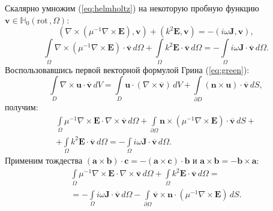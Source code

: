 \documentclass[a4paper,14pt]{article}
\begin{document}
Скалярно умножим (\ref{eq:helmholtz}) на некоторую пробную функцию $\mathbf{v} \in \mathbb{H}_{0}( \mathrm{rot}\,, \Omega )$:
\begin{equation*}
	(\nabla \times ( \mu^{-1} \nabla \times \mathbf{E} ), \mathbf{v}) + (k^{2} \mathbf{E} , \mathbf{v}) = - (i \omega \mathbf{J} , \mathbf{v}) ,
\end{equation*}
\begin{equation*}
	\int\limits_\Omega \nabla \times ( \mu^{-1} \nabla \times \mathbf{E} ) \cdot \overline{\mathbf{v}} \,d\Omega + \int\limits_\Omega k^{2} \mathbf{E} \cdot \overline{\mathbf{v}} \,d\Omega = - \int\limits_\Omega i \omega \mathbf{J} \cdot \overline{\mathbf{v}} \,d\Omega .
\end{equation*}
Воспользовавшись первой векторной формулой Грина (\ref{eq:green}):
\begin{equation}
	\int\limits_D \nabla \times \mathbf{u} \cdot \overline{\mathbf{v}} \,dV = \int\limits_D \mathbf{u} \cdot ( \nabla \times \overline{\mathbf{v}} ) \,dV + \int\limits_{\partial D} (\mathbf{n} \times \mathbf{u}) \cdot \overline{\mathbf{v}} \,dS , \label{eq:green}
\end{equation}
получим:
\begin{equation*}
	\begin{array}{c} { \displaystyle
		\int\limits_\Omega \mu^{-1} \nabla \times \mathbf{E} \cdot \nabla \times \overline{\mathbf{v}} \,d\Omega
		+ \int\limits_{\partial \Omega} \mathbf{n} \times (\mu^{-1} \nabla \times \mathbf{E}) \cdot \overline{\mathbf{v}} \,dS
		+
	} \\ { \displaystyle
		+ \int\limits_\Omega k^{2} \mathbf{E} \cdot \overline{\mathbf{v}} \,d\Omega
		=  - \int\limits_\Omega i \omega \mathbf{J} \cdot \overline{\mathbf{v}} \,d\Omega
		.
	} \end{array}
\end{equation*}
Применим тождества $(\mathbf{a} \times \mathbf{b}) \cdot \mathbf{c} = - (\mathbf{a} \times \mathbf{c}) \cdot \mathbf{b}$ и $\mathbf{a} \times \mathbf{b} = - \mathbf{b} \times \mathbf{a}$:
\begin{equation}
	\begin{array}{c} { \displaystyle
		\int\limits_\Omega \mu^{-1} \nabla \times \mathbf{E} \cdot \nabla \times \overline{\mathbf{v}} \,d\Omega
		+ \int\limits_\Omega k^{2} \mathbf{E} \cdot \overline{\mathbf{v}} \,d\Omega
		=
	} \\ { \displaystyle
		= - \int\limits_\Omega i \omega \mathbf{J} \cdot \overline{\mathbf{v}} \,d\Omega
		- \int\limits_{\partial \Omega} \overline{\mathbf{v}} \times \mathbf{n} \cdot (\mu^{-1} \nabla \times \mathbf{E}) \,dS
	.
	} \end{array}
	\label{eq:form_23}
\end{equation}
\end{document}
